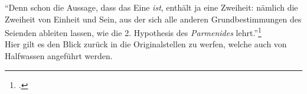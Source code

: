 \enquote{Denn schon die Aussage, dass das Eine \emph{ist}, enthält ja eine Zweiheit: nämlich die Zweiheit von Einheit und Sein, aus der sich alle anderen Grundbestimmungen des Seienden ableiten lassen, wie die 2. Hypothesis des \emph{Parmenides} lehrt.}\footcite[][S. 136f.]{halfwassen2015spuren}\\
Hier gilt es den Blick zurück in die Originalstellen zu werfen, welche auch von Halfwassen angeführt werden.





